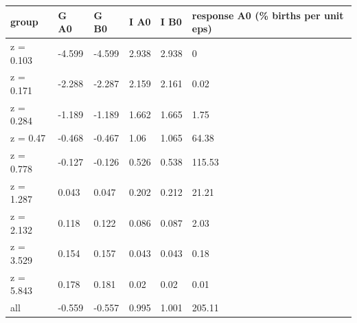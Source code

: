 \begingroup\small
\setlength{\tabcolsep}{3pt}
\renewcommand{\arraystretch}{1.04}
\begin{tabularx}{\linewidth}{XXXXXX}
\toprule
group & G A0 & G B0 & I A0 & I B0 & response A0 (\% births per unit eps) \\
\midrule
z = 0.103 & -4.599 & -4.599 & 2.938 & 2.938 & 0 \\
z = 0.171 & -2.288 & -2.287 & 2.159 & 2.161 & 0.02 \\
z = 0.284 & -1.189 & -1.189 & 1.662 & 1.665 & 1.75 \\
z = 0.47 & -0.468 & -0.467 & 1.06 & 1.065 & 64.38 \\
z = 0.778 & -0.127 & -0.126 & 0.526 & 0.538 & 115.53 \\
z = 1.287 & 0.043 & 0.047 & 0.202 & 0.212 & 21.21 \\
z = 2.132 & 0.118 & 0.122 & 0.086 & 0.087 & 2.03 \\
z = 3.529 & 0.154 & 0.157 & 0.043 & 0.043 & 0.18 \\
z = 5.843 & 0.178 & 0.181 & 0.02 & 0.02 & 0.01 \\
all & -0.559 & -0.557 & 0.995 & 1.001 & 205.11 \\
\bottomrule
\end{tabularx}
\endgroup
